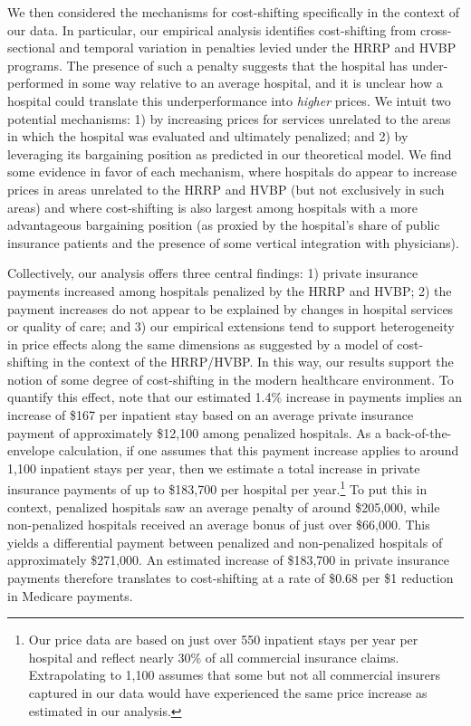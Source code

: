 \documentclass[12pt]{article}
\begin{document}
We then considered the mechanisms for cost-shifting specifically in the context of our data. In particular, our empirical analysis identifies cost-shifting from cross-sectional and temporal variation in penalties levied under the HRRP and HVBP programs. The presence of such a penalty suggests that the hospital has under-performed in some way relative to an average hospital, and it is unclear how a hospital could translate this underperformance into \textit{higher} prices. We intuit two potential mechanisms: 1) by increasing prices for services unrelated to the areas in which the hospital was evaluated and ultimately penalized; and 2) by leveraging its bargaining position as predicted in our theoretical model. We find some evidence in favor of each mechanism, where hospitals do appear to increase prices in areas unrelated to the HRRP and HVBP (but not exclusively in such areas) and where cost-shifting is also largest among hospitals with a more advantageous bargaining position (as proxied by the hospital's share of public insurance patients and the presence of some vertical integration with physicians).

Collectively, our analysis offers three central findings: 1) private insurance payments increased among hospitals penalized by the HRRP and HVBP; 2) the payment increases do not appear to be explained by changes in hospital services or quality of care; and 3) our empirical extensions tend to support heterogeneity in price effects along the same dimensions as suggested by a model of cost-shifting in the context of the HRRP/HVBP. In this way, our results support the notion of some degree of cost-shifting in the modern healthcare environment. To quantify this effect, note that our estimated 1.4\% increase in payments implies an increase of \$167 per inpatient stay based on an average private insurance payment of approximately \$12,100 among penalized hospitals. As a back-of-the-envelope calculation, if one assumes that this payment increase applies to around 1,100 inpatient stays per year, then we estimate a total increase in private insurance payments of up to \$183,700 per hospital per year.\footnote{Our price data are based on just over 550 inpatient stays per year per hospital and reflect nearly 30\% of all commercial insurance claims. Extrapolating to 1,100 assumes that some but not all commercial insurers captured in our data would have experienced the same price increase as estimated in our analysis.} To put this in context, penalized hospitals saw an average penalty of around \$205,000, while non-penalized hospitals received an average bonus of just over \$66,000. This yields a differential payment between penalized and non-penalized hospitals of approximately \$271,000. An estimated increase of \$183,700 in private insurance payments therefore translates to cost-shifting at a rate of \$0.68 per \$1 reduction in Medicare payments.
\end{document}
